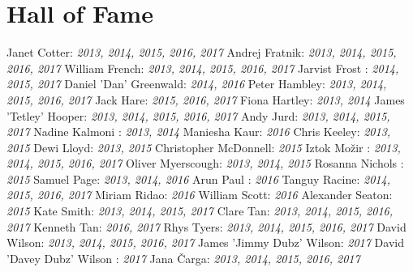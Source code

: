 \section{Hall of Fame} 

Janet Cotter: \textsl{2013, 2014, 2015, 2016, 2017 }
\newline
Andrej Fratnik: \textsl{2013, 2014, 2015, 2016, 2017 }
\newline
William French: \textsl{2013, 2014, 2015, 2016, 2017 }
\newline
Jarvist Frost : \textsl{2014, 2015, 2017 }
\newline
Daniel 'Dan' Greenwald: \textsl{2014, 2016 }
\newline
Peter Hambley: \textsl{2013, 2014, 2015, 2016, 2017 }
\newline
Jack Hare: \textsl{2015, 2016, 2017 }
\newline
Fiona Hartley: \textsl{2013, 2014 }
\newline
James 'Tetley' Hooper: \textsl{2013, 2014, 2015, 2016, 2017 }
\newline
Andy Jurd: \textsl{2013, 2014, 2015, 2017 }
\newline
Nadine Kalmoni : \textsl{2013, 2014 }
\newline
Maniesha Kaur: \textsl{2016 }
\newline
Chris Keeley: \textsl{2013, 2015 }
\newline
Dewi Lloyd: \textsl{2013, 2015 }
\newline
Christopher McDonnell: \textsl{2015 }
\newline
Iztok Mo\v{z}ir : \textsl{2013, 2014, 2015, 2016, 2017 }
\newline
Oliver Myerscough: \textsl{2013, 2014, 2015 }
\newline
Rosanna Nichols : \textsl{2015 }
\newline
Samuel Page: \textsl{2013, 2014, 2016 }
\newline
Arun Paul : \textsl{2016 }
\newline
Tanguy Racine: \textsl{2014, 2015, 2016, 2017 }
\newline
Miriam Ridao: \textsl{2016 }
\newline
William Scott: \textsl{2016 }
\newline
Alexander Seaton: \textsl{2015 }
\newline
Kate Smith: \textsl{2013, 2014, 2015, 2017 }
\newline
Clare Tan: \textsl{2013, 2014, 2015, 2016, 2017 }
\newline
Kenneth Tan: \textsl{2016, 2017 }
\newline
Rhys Tyers: \textsl{2013, 2014, 2015, 2016, 2017 }
\newline
David Wilson: \textsl{2013, 2014, 2015, 2016, 2017 }
\newline
James 'Jimmy Dubz' Wilson: \textsl{2017 }
\newline
David 'Davey Dubz' Wilson : \textsl{2017 }
\newline
Jana \v{C}arga: \textsl{2013, 2014, 2015, 2016, 2017 }
\newline
